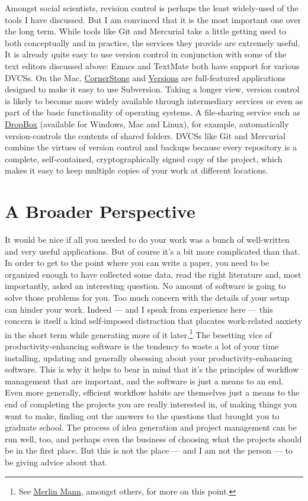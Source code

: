 \documentclass[11pt,article,oneside]{memoir}
\begin{document}
Amongst social scientists, revision control is perhaps the least widely-used of the tools I have discussed. But I am convinced that it is the most important one over the long term. While tools like Git and Mercurial take a little getting used to both conceptually and in practice, the services they provide are extremely useful. It is already quite easy to use version control in conjunction with some of the text editors discussed above: Emacs and TextMate both have support for various DVCSs. On the Mac, \href{http://www.zennaware.com/cornerstone/}{CornerStone} and \href{http://www.versionsapp.com/}{Versions} are full-featured applications designed to make it easy to use Subversion. Taking a longer view, version control is likely to become more widely available through intermediary services or even as part of the basic functionality of operating systems. A file-sharing service such as \href{https://www.getdropbox.com/}{DropBox} (available for Windows, Mac and Linux), for example, automatically version-controls the contents of shared folders. DVCSs like Git and Mercurial combine the virtues of version control and backups because every repository is a complete, self-contained, cryptographically signed copy of the project, which makes it easy to keep multiple copies of your work at different locations. 


\section{A Broader Perspective} 
It would be nice if all you needed to do your work was a bunch of well-written and very useful applications. But of course it's a bit more complicated than that. In order to get to the point where you can write a paper, you need to be organized enough to have collected some data, read the right literature and, most importantly, asked an interesting question. No amount of software is going to solve those problems for you. Too much concern with the details of your setup can hinder your work. Indeed --- and I speak from experience here --- this concern is itself a kind self-imposed distraction that placates work-related anxiety in the short term while generating more of it later.\footnote{See \href{http://inboxzero.com/}{Merlin Mann}, amongst others, for more on this point.} The besetting vice of productivity-enhancing software is the tendency to waste a lot of your time installing, updating and generally obsessing about your productivity-enhancing software. This is why it helps to bear in mind that it's the principles of workflow management that are important, and the software is just a means to an end. Even more generally, efficient workflow habits are themselves just a means to the end of completing the projects you are really interested in, of making things you want to make, finding out the answers to the questions that brought you to graduate school. The process of idea generation and project management can be run well, too, and perhaps even the business of choosing what the projects should be in the first place. But this is not the place --- and I am not the person --- to be giving advice about that.
\end{document}
